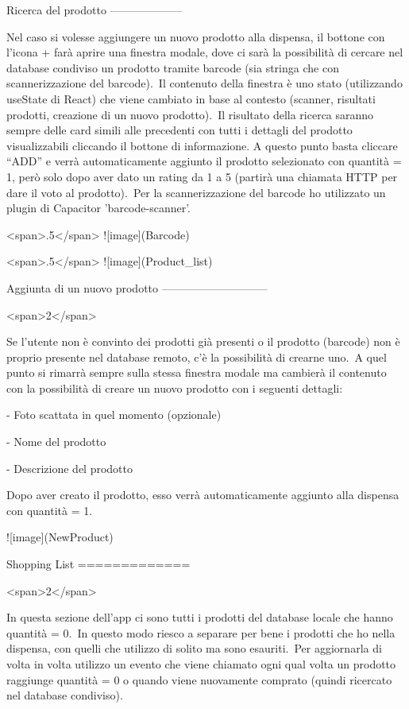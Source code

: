 Ricerca del prodotto
--------------------

Nel caso si volesse aggiungere un nuovo prodotto alla dispensa, il
bottone con l’icona + farà aprire una finestra modale, dove ci sarà la
possibilità di cercare nel database condiviso un prodotto tramite
barcode (sia stringa che con scannerizzazione del barcode).\
Il contenuto della finestra è uno stato (utilizzando useState di React)
che viene cambiato in base al contesto (scanner, risultati prodotti,
creazione di un nuovo prodotto).\
Il risultato della ricerca saranno sempre delle card simili alle
precedenti con tutti i dettagli del prodotto visualizzabili cliccando il
bottone di informazione. A questo punto basta cliccare “ADD” e verrà
automaticamente aggiunto il prodotto selezionato con quantità = 1, però
solo dopo aver dato un rating da 1 a 5 (partirà una chiamata HTTP per
dare il voto al prodotto).\
Per la scannerizzazione del barcode ho utilizzato un plugin di Capacitor
’barcode-scanner’.

<span>.5</span> ![image](Barcode)

<span>.5</span> ![image](Product_list)

Aggiunta di un nuovo prodotto
-----------------------------

<span>2</span>

Se l’utente non è convinto dei prodotti già presenti o il prodotto
(barcode) non è proprio presente nel database remoto, c’è la possibilità
di crearne uno.\
A quel punto si rimarrà sempre sulla stessa finestra modale ma cambierà
il contenuto con la possibilità di creare un nuovo prodotto con i
seguenti dettagli:

-   Foto scattata in quel momento (opzionale)

-   Nome del prodotto

-   Descrizione del prodotto

Dopo aver creato il prodotto, esso verrà automaticamente aggiunto alla
dispensa con quantità = 1.

![image](NewProduct)

Shopping List
=============

<span>2</span>

In questa sezione dell’app ci sono tutti i prodotti del database locale
che hanno quantità = 0.\
In questo modo riesco a separare per bene i prodotti che ho nella
dispensa, con quelli che utilizzo di solito ma sono esauriti.\
Per aggiornarla di volta in volta utilizzo un evento che viene chiamato
ogni qual volta un prodotto raggiunge quantità = 0 o quando viene
nuovamente comprato (quindi ricercato nel database condiviso).

